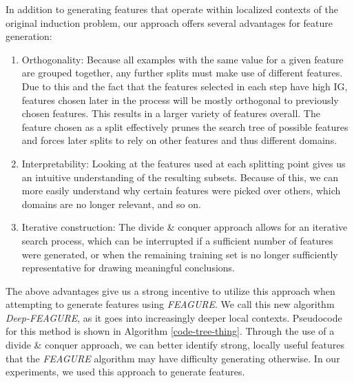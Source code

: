 \documentclass[twoside,11pt]{article}
\theoremstyle{definition}
\begin{document}
In addition to generating features that operate within localized contexts of the original induction problem, our approach offers several advantages for feature generation:
\begin{enumerate}
	\item Orthogonality: Because all examples with the same value for a given feature are grouped together, any further splits must make use of different features. Due to this and the fact that the features selected in each step have high IG, features chosen later in the process will be mostly orthogonal to previously chosen features. This results in a larger variety of features overall. The feature chosen as a split effectively prunes the search tree of possible features and forces later splits to rely on other features and thus different domains.
	\item Interpretability: Looking at the features used at each splitting point gives us an intuitive understanding of the resulting subsets. Because of this, we can more easily understand why certain features were picked over others, which domains are no longer relevant, and so on.
	\item Iterative construction: The divide \& conquer approach allows for an iterative search process, which can be interrupted if a sufficient number of features were generated, or when the remaining training set is no longer sufficiently representative for drawing meaningful conclusions.
\end{enumerate}

The above advantages give us a strong incentive to utilize this approach when attempting to generate features using \emph{FEAGURE}. 
We call this new algorithm \emph{Deep-FEAGURE}, as it goes into increasingly deeper local contexts. 
Pseudocode for this method is shown in Algorithm \ref{code-tree-thing}.
Through the use of a divide \& conquer approach, we can better identify strong, locally useful features that the \emph{FEAGURE} algorithm may have difficulty generating otherwise. In our experiments, we used this approach to generate features.
\end{document}
